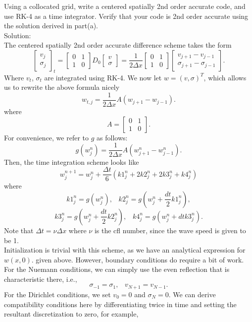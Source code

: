 \item Using a collocated grid, write a centered spatially 2nd order accurate code, and use RK-4 as a time integrator. Verify that your code is 2nd order accurate using the solution derived in part(a).\\
Solution:\\
The centered spatially 2nd order accurate difference scheme takes the form
$$\left[\begin{array}{c}v_j\\ \sigma_j\end{array}\right]_t=\left[\begin{array}{cc}0&1\\1&0\end{array}\right]D_0\left[\begin{array}{c}v\\ \sigma\end{array}\right]=\frac{1}{2\Delta x}\left[\begin{array}{cc}0&1\\1&0\end{array}\right]\left[\begin{array}{c}v_{j+1}-v_{j-1} \\ \sigma_{j+1}-\sigma_{j-1}\end{array}\right].$$
Where $v_t$, $\sigma_t$ are integrated using RK-4. We now let $w=(v,\sigma)^T$, which allows us to rewrite the above formula nicely
$$w_{t,j}=\frac{1}{2\Delta x}A(w_{j+1}-w_{j-1}).$$
where 
$$A=\left[\begin{array}{cc}0&1\\1&0\end{array}\right].$$
For convenience, we refer to $g$ as follows:
$$g(w_j^n)=\frac{1}{2\Delta x}A(w_{j+1}^n-w_{j-1}^n).$$
Then, the time integration scheme looks like
$$w_j^{n+1}=w_j^n+\frac{\Delta t}{6}(k1_j^n+2k2_j^n+2k3_j^n+k4_j^n)$$
where 
$$k1_j^n=g(w_j^n),\;\;\; k2_j^n=g(w_j^n+\frac{dt}{2}k1_j^n),$$
$$k3_j^n=g(w_j^n+\frac{dt}{2}k2_j^n),\;\;\; k4_j^n=g(w_j^n+dt k3_j^n).$$
Note that $\Delta t=\nu \Delta x$ where $\nu$ is the cfl number, since the wave speed is given to be 1.\\
Initialization is trivial with this scheme, as we have an analytical expression for $w(x,0).$ given above. However, boundary conditions do require a bit of work. For the Nuemann conditions, we can simply use the even reflection that is characteristic there, i.e.,
$$\sigma_{-1}=\sigma_1,\;\;\; v_{N+1}=v_{N-1}.$$
For the Dirichlet conditions, we set $v_0=0$ and $\sigma_N=0.$ We can derive compatibility conditions here by differentiating twice in time and setting the resultant discretization to zero, for example,
